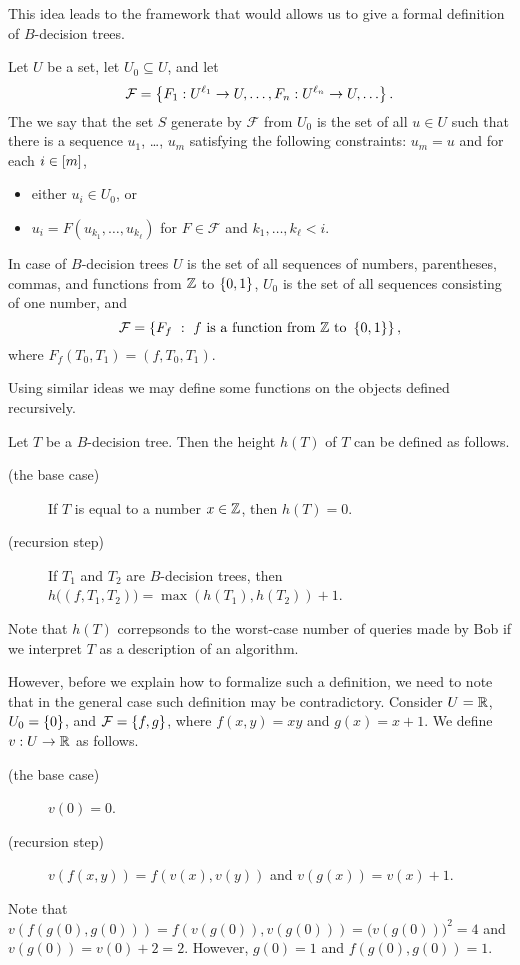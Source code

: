 This idea leads to the framework that would allows us to give a formal
definition of $B$-decision trees.
\begin{definition}
  Let $U$ be a set, let $U_0 \subseteq U$, and let
  \[
    \mathcal{F} =
    \set{F_1 : U^{\ell_1} \to U, \dots, F_n : U^{\ell_n} \to U, \dots}.
  \]
  The we say that the set $S$ generate by $\mathcal{F}$ from $U_0$ is
  the set of all $u \in U$ such that there is a sequence
  $u_1$, \dots, $u_m$ satisfying the following constraints: $u_m = u$ and
  for each $i \in {[{m}]}$,
  \begin{itemize}
    \item either $u_i \in U_0$, or
    \item $u_i = F(u_{k_1}, \dots, u_{k_\ell})$
      for $F \in \mathcal{F}$ and $k_1, \dots, k_\ell < i$.
  \end{itemize}
\end{definition}
In case of $B$-decision trees $U$ is the set of all sequences of numbers,
parentheses, commas, and functions from ${\mathbb{Z}}$ to $\set{0, 1}$,
$U_0$ is the set of all sequences consisting of one number, and
\[
  \mathcal{F} =
  \set[
    {
      f \text{ is a function from } \Z
        \text{ to } \set{0, 1}
    }
  ]{F_f},
\]
where $F_f(T_0, T_1) = (f, T_0, T_1)$.

Using similar ideas we may define some functions on the objects defined
recursively.
\begin{definition}
  Let $T$ be a $B$-decision tree. Then the height $h(T)$ of $T$ can be
  defined as follows.
  \begin{description}
      \item [(the base case)] If $T$ is equal to a number $x \in {\mathbb{Z}}$,
        then $h(T) = 0$.
      \item[(recursion step)] If $T_1$ and $T_2$ are $B$-decision trees, then
        $h\big((f, T_1, T_2)\big) = \max(h(T_1), h(T_2)) + 1$.
  \end{description}
\end{definition}
Note that $h(T)$ correpsonds to the worst-case number of queries made by Bob if
we interpret $T$ as a description of an algorithm.

However, before we explain how to formalize such a definition, we need to note
that in the general case such definition may be contradictory. Consider
$U = {\mathbb{R}}$, $U_0 = \set{0}$, and $\mathcal{F} = \set{f, g}$, where $f(x, y) = xy$
and $g(x) = x + 1$. We define $v : U \to {\mathbb{R}}$ as follows.
\begin{description}
    \item [(the base case)] $v(0) = 0$.
    \item[(recursion step)] $v(f(x, y)) = f(v(x), v(y))$ and
      $v(g(x)) = v(x) + 1$.
\end{description}
Note that $v(f(g(0), g(0))) = f(v(g(0)), v(g(0))) = \big(v(g(0))\big)^2 = 4$
and $v(g(0)) = v(0) + 2 = 2$.
However, $g(0) = 1$ and $f(g(0), g(0)) = 1$.

